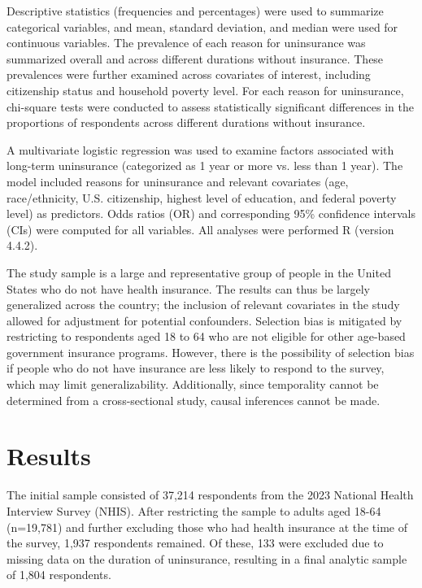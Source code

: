 \documentclass[12pt]{article}
\begin{document}
Descriptive statistics (frequencies and percentages) were used to summarize categorical variables, and mean, standard deviation, and median were used for continuous variables. The prevalence of each reason for uninsurance was summarized overall and across different durations without insurance. These prevalences were further examined across covariates of interest, including citizenship status and household poverty level. For each reason for uninsurance, chi-square tests were conducted to assess statistically significant differences in the proportions of respondents across different durations without insurance.

A multivariate logistic regression was used to examine factors associated with long-term uninsurance (categorized as 1 year or more vs. less than 1 year). The model included reasons for uninsurance and relevant covariates (age, race/ethnicity, U.S. citizenship, highest level of education, and federal poverty level) as predictors. Odds ratios (OR) and corresponding 95\% confidence intervals (CIs) were computed for all variables. All analyses were performed R (version 4.4.2).

The study sample is a large and representative group of people in the United States who do not have health insurance. The results can thus be largely generalized across the country; the inclusion of relevant covariates in the study allowed for adjustment for potential confounders. Selection bias is mitigated by restricting to respondents aged 18 to 64 who are not eligible for other age-based government insurance programs. However, there is the possibility of selection bias if people who do not have insurance are less likely to respond to the survey, which may limit generalizability. Additionally, since temporality cannot be determined from a cross-sectional study, causal inferences cannot be made.


\newpage
\section{Results}

The initial sample consisted of 37,214 respondents from the 2023 National Health Interview Survey (NHIS). After restricting the sample to adults aged 18-64 (n=19,781) and further excluding those who had health insurance at the time of the survey, 1,937 respondents remained. Of these, 133 were excluded due to missing data on the duration of uninsurance, resulting in a final analytic sample of 1,804 respondents.
\end{document}
